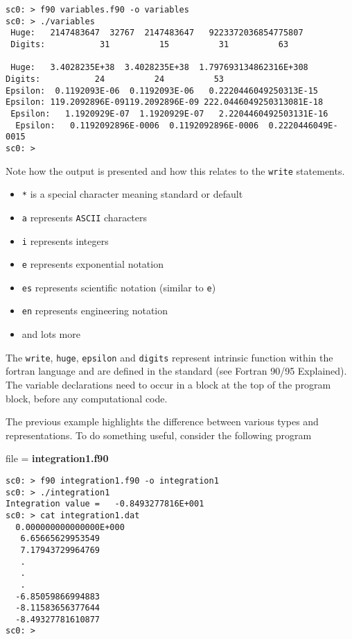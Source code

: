 \documentclass[12pt,a4paper,oneside,openany]{report}
\newcommand{\fcode}[1]{\par file = \textbf{#1} }
\newcommand{\code}[1]{\texttt{#1}}
\begin{document}
\begin{verbatim}
sc0: > f90 variables.f90 -o variables
sc0: > ./variables
 Huge:   2147483647  32767  2147483647   9223372036854775807
 Digits:           31          15          31          63
 
 Huge:   3.4028235E+38  3.4028235E+38  1.797693134862316E+308
Digits:           24          24          53
Epsilon:  0.1192093E-06  0.1192093E-06   0.2220446049250313E-15
Epsilon: 119.2092896E-09119.2092896E-09 222.0446049250313081E-18
 Epsilon:   1.1920929E-07  1.1920929E-07   2.2204460492503131E-16
  Epsilon:   0.1192092896E-0006  0.1192092896E-0006  0.2220446049E-0015
sc0: > 
\end{verbatim}

Note how the output is presented and how this relates to the \code{write} statements.
\begin{itemize}
\item \code{*} is a special character meaning standard or default
\item \code{a} represents \code{ASCII} characters
\item \code{i} represents integers
\item \code{e} represents exponential notation
\item \code{es} represents scientific notation (similar to \code{e})
\item \code{en} represents engineering notation
\item and lots more
\end{itemize}
The \code{write}, \code{huge}, \code{epsilon} and \code{digits} represent intrinsic function within the fortran language and are defined in the standard (see Fortran 90/95 Explained).  The variable declarations need to occur in a block at the top of the program block, before any computational code.

\newpage

The previous example highlights the difference between various types and representations.  To do something useful, consider the following program
\fcode{integration1.f90}

\newpage

\begin{verbatim}
sc0: > f90 integration1.f90 -o integration1
sc0: > ./integration1
Integration value =   -0.8493277816E+001
sc0: > cat integration1.dat
  0.000000000000000E+000
   6.65665629953549     
   7.17943729964769     
   .
   .
   .
  -6.85059866994883     
  -8.11583656377644     
  -8.49327781610877     
sc0: >
\end{verbatim}
\end{document}
